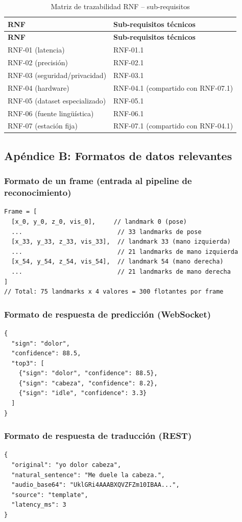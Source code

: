 \small
\begin{longtable}{>{\raggedright\arraybackslash}p{3.4cm} >{\raggedright\arraybackslash}p{10.2cm}}
    \caption{Matriz de trazabilidad RNF -- sub-requisitos}
    \label{tab:trazabilidad-rnf} \\
    \toprule
    \textbf{RNF} & \textbf{Sub-requisitos técnicos} \\
    \midrule
    \endfirsthead
    \toprule
    \textbf{RNF} & \textbf{Sub-requisitos técnicos} \\
    \midrule
    \endhead
    RNF-01 (latencia) & RNF-01.1 \\
    RNF-02 (precisión) & RNF-02.1 \\
    RNF-03 (seguridad/privacidad) & RNF-03.1 \\
    RNF-04 (hardware) & RNF-04.1 (compartido con RNF-07.1) \\
    RNF-05 (dataset especializado) & RNF-05.1 \\
    RNF-06 (fuente lingüística) & RNF-06.1 \\
    RNF-07 (estación fija) & RNF-07.1 (compartido con RNF-04.1) \\
    \bottomrule
\end{longtable}

\subsection{Apéndice B: Formatos de datos relevantes}

\subsubsection{Formato de un frame (entrada al pipeline de reconocimiento)}
\begin{verbatim}
Frame = [
  [x_0, y_0, z_0, vis_0],     // landmark 0 (pose)
  ...                          // 33 landmarks de pose
  [x_33, y_33, z_33, vis_33],  // landmark 33 (mano izquierda)
  ...                          // 21 landmarks de mano izquierda
  [x_54, y_54, z_54, vis_54],  // landmark 54 (mano derecha)
  ...                          // 21 landmarks de mano derecha
]
// Total: 75 landmarks x 4 valores = 300 flotantes por frame
\end{verbatim}

\subsubsection{Formato de respuesta de predicción (WebSocket)}
\begin{verbatim}
{
  "sign": "dolor",
  "confidence": 88.5,
  "top3": [
    {"sign": "dolor", "confidence": 88.5},
    {"sign": "cabeza", "confidence": 8.2},
    {"sign": "idle", "confidence": 3.3}
  ]
}
\end{verbatim}

\subsubsection{Formato de respuesta de traducción (REST)}
\begin{verbatim}
{
  "original": "yo dolor cabeza",
  "natural_sentence": "Me duele la cabeza.",
  "audio_base64": "UklGRi4AAABXQVZFZm10IBAA...",
  "source": "template",
  "latency_ms": 3
}
\end{verbatim}
